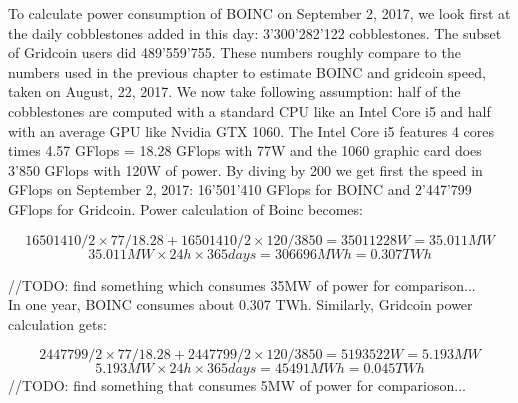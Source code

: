 To calculate power consumption of BOINC on September 2, 2017, we look first at the daily cobblestones added in this day: 3'300'282'122 cobblestones. The subset of Gridcoin users did 489'559'755. These numbers roughly compare to the numbers used in the previous chapter to estimate BOINC and gridcoin speed, taken on August, 22, 2017. We now take following assumption: half of the cobblestones are computed with a standard CPU like an Intel Core i5 and half with an average GPU like Nvidia GTX 1060. The Intel Core i5 features 4 cores times 4.57 GFlops = 18.28 GFlops with 77W and the 1060 graphic card does 3'850 GFlops with 120W of power. By diving by 200 we get first the speed in GFlops on September 2, 2017: 16'501'410 GFlops for BOINC and 2'447'799 GFlops for Gridcoin. Power calculation of Boinc becomes:

\[ 16501410/2 \times 77/18.28 + 16501410/2 \times 120/3850 = 35011228 W = 35.011 MW \]
\[ 35.011MW \times 24 h \times 365 days = 306696 MWh = 0.307 TWh \]

//TODO: find something which consumes 35MW of power for comparison...\\
In one year, BOINC consumes about 0.307 TWh. Similarly, Gridcoin power calculation gets:

\[ 2447799/2 \times 77/18.28 + 2447799/2 \times 120/3850 = 5193522 W = 5.193 MW \]
\[ 5.193MW \times 24 h \times 365 days = 45491 MWh = 0.045 TWh \]
//TODO: find something that consumes 5MW of power for comparioson...\\


